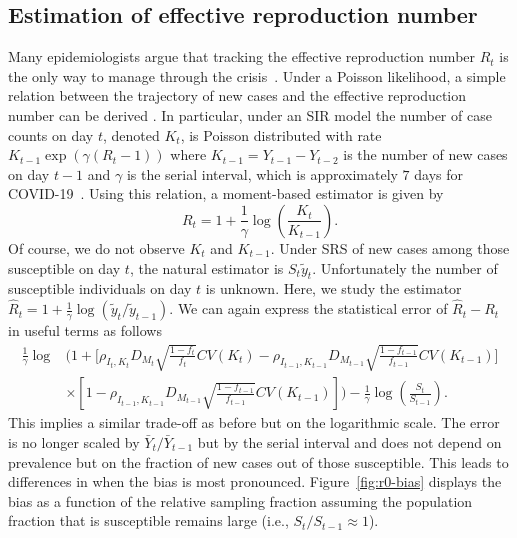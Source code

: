 \documentclass[11pt]{amsart}
\numberwithin{equation}{section}
\theoremstyle{plain}
\begin{document}
 \subsection{Estimation of effective reproduction number}
 \label{section:r0-estimation}
 Many epidemiologists argue that tracking the effective reproduction number $R_t$ is the only way to manage through the crisis~\citep{Gabriel2020}.  Under a Poisson likelihood, a simple relation between the trajectory of new cases and the effective reproduction number can be derived \citep{Bettencourt2008}.  In particular, under an SIR model the number of case counts on day $t$, denoted $K_t$, is Poisson distributed with rate $K_{t-1} \exp \left( \gamma (R_t - 1) \right)$ where $K_{t-1} = Y_{t-1}-Y_{t-2}$ is the number of new cases on day $t-1$ and $\gamma$ is the serial interval, which is approximately $7$ days for COVID-19~\citep{Sanche2020}.  Using this relation, a moment-based estimator is given by
 $$
 R_t = 1 + \frac{1}{\gamma} \log \left( \frac{K_t}{K_{t-1}} \right).
 $$
 Of course, we do not observe $K_t$ and $K_{t-1}$.  Under SRS of new cases among those susceptible on day $t$, the natural estimator is $S_t \tilde y_t$.  Unfortunately the number of susceptible individuals on day $t$ is unknown. Here, we study the estimator $\hat R_t = 1 + \frac{1}{\gamma} \log \left( \tilde y_t / \tilde y_{t-1} \right)$. We can again express the statistical error of $\hat R_t - R_t$ in useful terms as follows
 $$
 \begin{aligned}
 \frac{1}{\gamma}\log &\bigg( 1 + \bigg[ \rho_{I_t,K_t} D_{M_t} \sqrt{\frac{1-f_t}{f_t}} CV (K_t)  -\rho_{I_{t-1},K_{t-1}} D_{M_{t-1}} \sqrt{\frac{1-f_{t-1}}{f_{t-1}}} CV (K_{t-1}) \bigg] \\
 &\times \left[ 1 - \rho_{I_{t-1},K_{t-1}} D_{M_{t-1}} \sqrt{\frac{1-f_{t-1}}{f_{t-1}}} CV (K_{t-1}) \right] \bigg) - \frac{1}{\gamma} \log \left( \frac{S_t}{S_{t-1}} \right).
 \end{aligned}
 $$
 This implies a similar trade-off as before but on the logarithmic scale.  The error is no longer scaled by $\bar Y_t/\bar Y_{t-1}$ but by the serial interval and does not depend on prevalence but on the fraction of new cases out of those susceptible. This leads to differences in when the bias is most pronounced. Figure~\ref{fig:r0-bias} displays the bias as a function of the relative sampling fraction assuming the population fraction that is susceptible remains large (i.e., $S_t / S_{t-1} \approx 1$).
\end{document}
